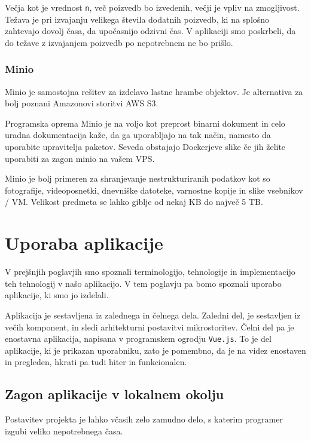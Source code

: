 \documentclass[a4paper, 12pt]{book}
\begin{document}
Večja kot je vrednost \verb=n=, več poizvedb bo izvedenih, večji je vpliv na zmogljivost. Težava je pri izvajanju velikega števila dodatnih poizvedb, ki na splošno zahtevajo dovolj časa, da upočasnijo odzivni čas. V aplikaciji smo poskrbeli, da do težave z izvajanjem poizvedb po nepotrebnem ne bo prišlo.  



\subsection{Minio}
\label{minio-what}
Minio je samostojna rešitev za izdelavo lastne hrambe objektov. Je alternativa za bolj poznani Amazonovi storitvi AWS S3.

Programska oprema Minio je na voljo kot preprost binarni dokument in celo uradna dokumentacija kaže, da ga uporabljajo na tak način, namesto da uporabite upravitelja paketov. Seveda obstajajo Dockerjeve slike če jih želite uporabiti za zagon minio na vašem VPS.

Minio je bolj primeren za shranjevanje nestrukturiranih podatkov kot so fotografije, videoposnetki, dnevniške datoteke, varnostne kopije in slike vsebnikov / VM. Velikost predmeta se lahko giblje od nekaj KB do največ 5 TB.


\chapter{Uporaba aplikacije}
V prejšnjih poglavjih smo spoznali terminologijo, tehnologije in implementacijo teh tehnologij v našo aplikacijo. V tem poglavju pa bomo spoznali uporabo aplikacije, ki smo jo izdelali.

Aplikacija je sestavljena iz zalednega in čelnega dela. Zaledni del, je sestavljen iz večih komponent, in sledi arhitekturni postavitvi mikrostoritev. Čelni del pa je enostavna aplikacija, napisana v programskem ogrodju \verb=Vue.js=. To je del aplikacije, ki je prikazan uporabniku, zato je pomembno, da je na videz enostaven in pregleden, hkrati pa tudi hiter in funkcionalen. 


\section{Zagon aplikacije v lokalnem okolju}
Postavitev projekta je lahko včasih zelo zamudno delo, s katerim programer izgubi veliko nepotrebnega časa. 
\end{document}
